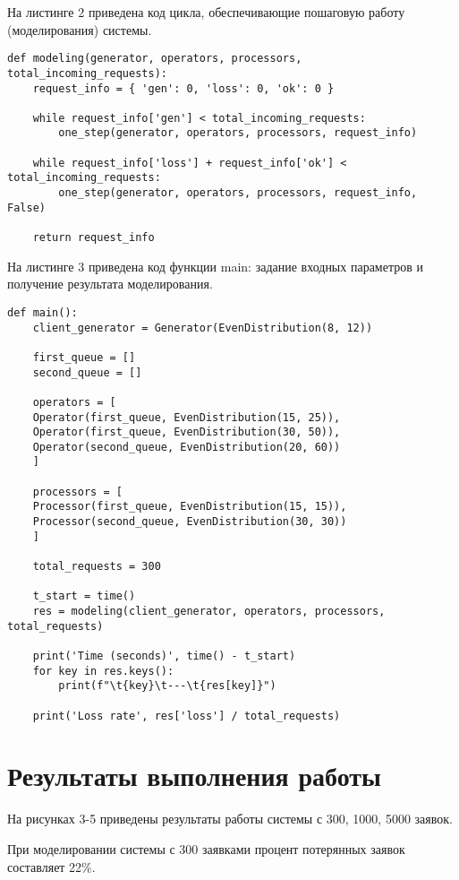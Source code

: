 На листинге 2 приведена код цикла, обеспечивающие пошаговую работу (моделирования) системы.
\begin{lstlisting}[label=CodeStand,caption=Цикл пошагового моделирования системы]
def modeling(generator, operators, processors, total_incoming_requests):
	request_info = { 'gen': 0, 'loss': 0, 'ok': 0 }
	
	while request_info['gen'] < total_incoming_requests:
		one_step(generator, operators, processors, request_info)
	
	while request_info['loss'] + request_info['ok'] < total_incoming_requests:
		one_step(generator, operators, processors, request_info, False)
	
	return request_info
\end{lstlisting}


На листинге 3 приведена код функции main: задание входных параметров и получение результата моделирования.
\begin{lstlisting}[label=CodeStand,caption=Фукнция main]
def main():
	client_generator = Generator(EvenDistribution(8, 12))
	
	first_queue = []
	second_queue = []
	
	operators = [
	Operator(first_queue, EvenDistribution(15, 25)),
	Operator(first_queue, EvenDistribution(30, 50)),
	Operator(second_queue, EvenDistribution(20, 60))
	]
	
	processors = [
	Processor(first_queue, EvenDistribution(15, 15)),
	Processor(second_queue, EvenDistribution(30, 30))
	]
	
	total_requests = 300
	
	t_start = time()
	res = modeling(client_generator, operators, processors, total_requests)
	
	print('Time (seconds)', time() - t_start)
	for key in res.keys():
		print(f"\t{key}\t---\t{res[key]}")
	
	print('Loss rate', res['loss'] / total_requests)
\end{lstlisting}



\section*{Результаты выполнения работы}

На рисунках 3-5 приведены результаты работы системы с 300, 1000, 5000 заявок.


При моделировании системы с 300 заявками процент потерянных заявок составляет 22\%.








